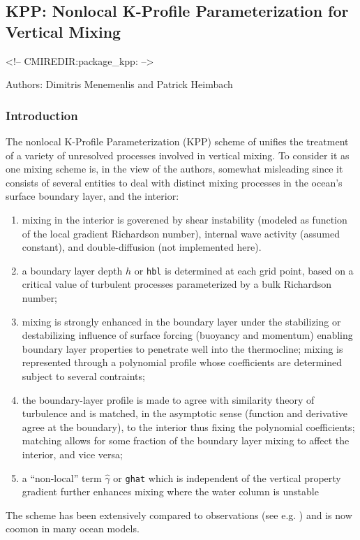 \subsection{KPP: Nonlocal K-Profile Parameterization for 
Vertical Mixing}

\label{sec:pkg:kpp}
\begin{rawhtml}
<!-- CMIREDIR:package_kpp: -->
\end{rawhtml}

Authors: Dimitris Menemenlis and Patrick Heimbach

\subsubsection{Introduction
\label{sec:pkg:kpp:intro}}

The nonlocal K-Profile Parameterization (KPP) scheme
of \cite{lar-eta:94} unifies the treatment of a variety of 
unresolved processes involved in vertical mixing. 
To consider it as one mixing scheme is, in the view of the authors,
somewhat misleading since it consists of several entities
to deal with distinct mixing processes in the ocean's surface 
boundary layer, and the interior:
%
\begin{enumerate}
%
\item
mixing in the interior is goverened by
shear instability (modeled as function of the local gradient
Richardson number), internal wave activity (assumed constant),
and double-diffusion (not implemented here).
%
\item
a boundary layer depth $h$ or \texttt{hbl} is determined
at each grid point, based on a critical value of turbulent
processes parameterized by a bulk Richardson number;
%
\item
mixing is strongly enhanced in the boundary layer under the
stabilizing or destabilizing influence of surface forcing 
(buoyancy and momentum) enabling boundary layer properties
to penetrate well into the thermocline; 
mixing is represented through a polynomial profile whose 
coefficients are determined subject to several contraints;
%
\item
the boundary-layer profile is made to agree with similarity
theory of turbulence and is matched, in the asymptotic sense
(function and derivative agree at the boundary),
to the interior thus fixing the polynomial coefficients; 
matching allows for some fraction of the boundary layer mixing
to affect the interior, and vice versa;
%
\item
a ``non-local'' term $\hat{\gamma}$ or \texttt{ghat}
which is independent of the vertical property gradient further 
enhances mixing where the water column is unstable
%
\end{enumerate}
%
The scheme has been extensively compared to observations
(see e.g. \cite{lar-eta:97}) and is now coomon in many
ocean models.

